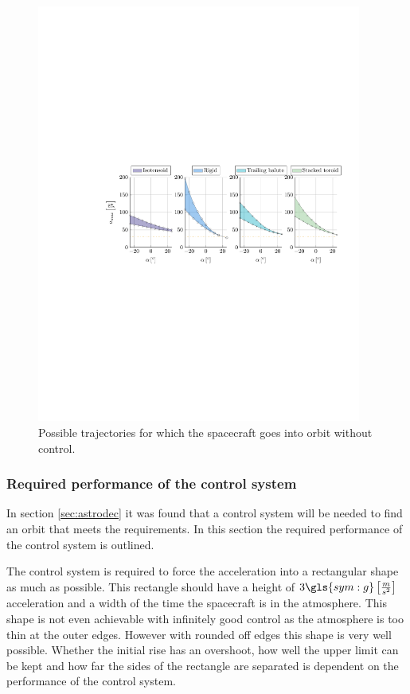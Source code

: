 \begin{figure}[h]
	\centering
	\includegraphics[trim={4.25cm 10.5cm 1cm 10.5cm},clip,width=0.95\textwidth]{Figure/orbital_model/n_alpha.pdf}
	\caption{Possible trajectories for which the spacecraft goes into orbit without control.}
	\label{fig:n_alpha}
\end{figure}

\subsubsection{Required performance of the control system}
\label{sec:astroperfomance}

In section \ref{sec:astrodec} it was found that a control system will be needed to find an orbit that meets the requirements. In this section the required performance of the control system is outlined.

The control system is required to force the acceleration into a rectangular shape as much as possible. This rectangle should have a height of $3 \gls{sym:g} \left[\frac{m}{s^2}\right]$ acceleration and a width of the time the spacecraft is in the atmosphere. This shape is not even achievable with infinitely good control as the atmosphere is too thin at the outer edges. However with rounded off edges this shape is very well possible. Whether the initial rise has an overshoot, how well the upper limit can be kept and how far the sides of the rectangle are separated is dependent on the performance of the control system.

